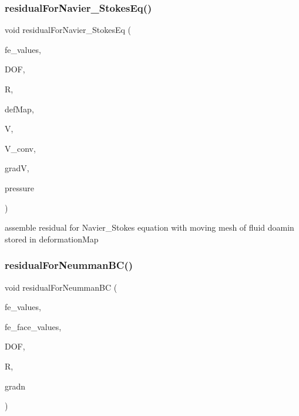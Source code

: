 \subsubsection{\texorpdfstring{residual\+For\+Navier\+\_\+\+Stokes\+Eq()}{residualForNavier\_StokesEq()}}
{\footnotesize\ttfamily void residual\+For\+Navier\+\_\+\+Stokes\+Eq (\begin{DoxyParamCaption}\item[{const F\+E\+Values$<$ dim $>$ \&}]{fe\+\_\+values,  }\item[{unsigned int}]{D\+OF,  }\item[{Table$<$ 1, T $>$ \&}]{R,  }\item[{\mbox{\hyperlink{structdeformation_map}{deformation\+Map}}$<$ T, dim $>$ \&}]{def\+Map,  }\item[{Table$<$ 2, T $>$ \&}]{V,  }\item[{dealii\+::\+Table$<$ 2, double $>$ \&}]{V\+\_\+conv,  }\item[{Table$<$ 3, T $>$ \&}]{gradV,  }\item[{dealii\+::\+Table$<$ 1, T $>$ \&}]{pressure }\end{DoxyParamCaption})}

assemble residual for Navier\+\_\+\+Stokes equation with moving mesh of fluid doamin stored in deformation\+Map \mbox{\label{class_residual_a4c8fd158c8034b25780abfe785755baa}} 
\subsubsection{\texorpdfstring{residual\+For\+Neumman\+B\+C()}{residualForNeummanBC()}\hspace{0.1cm}{\footnotesize\ttfamily [1/4]}}
{\footnotesize\ttfamily void residual\+For\+Neumman\+BC (\begin{DoxyParamCaption}\item[{const F\+E\+Values$<$ dim $>$ \&}]{fe\+\_\+values,  }\item[{const F\+E\+Face\+Values$<$ dim $>$ \&}]{fe\+\_\+face\+\_\+values,  }\item[{unsigned int}]{D\+OF,  }\item[{dealii\+::\+Table$<$ 1, T $>$ \&}]{R,  }\item[{dealii\+::\+Table$<$ 2, T $>$ \&}]{gradn }\end{DoxyParamCaption})}

